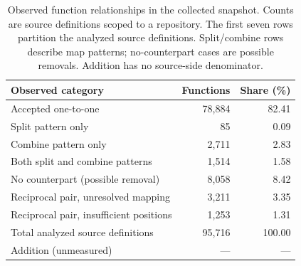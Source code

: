 \begin{table}[htbp]
\caption{Observed function relationships in the collected snapshot. Counts are source definitions scoped to a repository. The first seven rows partition the analyzed source definitions. Split/combine rows describe map patterns; no-counterpart cases are possible removals. Addition has no source-side denominator.}
\label{tab:collection-transformations}
\centering\small
\begin{tabular}{@{}lrr@{}}
\toprule
Observed category & Functions & Share (\%)\\
\midrule
Accepted one-to-one & 78,884 & 82.41\\
Split pattern only & 85 & 0.09\\
Combine pattern only & 2,711 & 2.83\\
Both split and combine patterns & 1,514 & 1.58\\
No counterpart (possible removal) & 8,058 & 8.42\\
Reciprocal pair, unresolved mapping & 3,211 & 3.35\\
Reciprocal pair, insufficient positions & 1,253 & 1.31\\
\midrule
Total analyzed source definitions & 95,716 & 100.00\\
Addition (unmeasured) & --- & ---\\
\bottomrule
\end{tabular}
\end{table}
